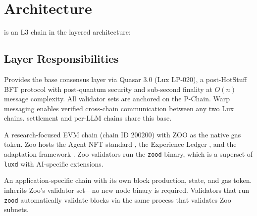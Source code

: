 \section{Architecture}
\label{sec:architecture}

\Beluga{} is an L3 chain in the \Lux{} layered architecture:

\begin{center}
\end{center}

\subsection{Layer Responsibilities}

\begin{description}[leftmargin=2cm, style=nextline]
    \item[Lux (L0)] Provides the base consensus layer via Quasar 3.0 \cite{lux-quasar} (Lux LP-020), a post-HotStuff BFT protocol with post-quantum security and sub-second finality at $O(n)$ message complexity. All validator sets are anchored on the P-Chain. Warp messaging enables verified cross-chain communication between any two Lux chains. \Beluga{} settlement and \Zoo{} per-LLM chains \cite{zoo-per-llm-chains} share this base.
    \item[Zoo (L2)] A research-focused EVM chain (chain ID 200200) with ZOO as the native gas token. Zoo hosts the Agent NFT standard \cite{zoo-agent-nft}, the Experience Ledger \cite{zoo-experience-ledger}, and the \DSO{} adaptation framework \cite{zoo-dso}. Zoo validators run the \texttt{zood} binary, which is a superset of \texttt{luxd} with AI-specific extensions.
    \item[Beluga (L3)] An application-specific chain with its own block production, state, and gas token. \Beluga{} inherits Zoo's validator set---no new node binary is required. Validators that run \texttt{zood} automatically validate \Beluga{} blocks via the same process that validates Zoo subnets.
\end{description}

